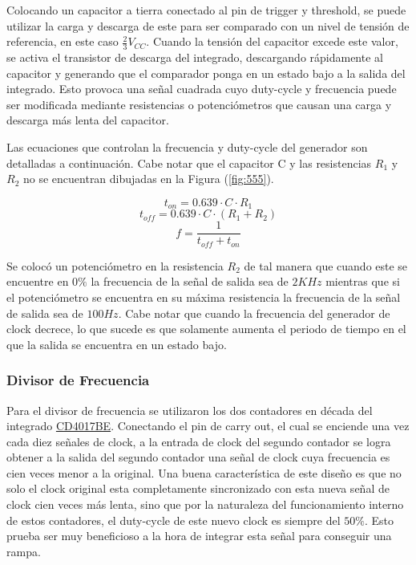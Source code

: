 Colocando un capacitor a tierra conectado al pin de trigger y threshold, se puede utilizar la carga y descarga de este para ser comparado con un nivel de tensión de referencia, en este caso $\frac{2}{3} V_{CC}$. Cuando la tensión del capacitor excede este valor, se activa el transistor de descarga del integrado, descargando rápidamente al capacitor y generando que el comparador ponga en un estado bajo a la salida del integrado. Esto provoca una señal cuadrada cuyo duty-cycle y frecuencia puede ser modificada mediante resistencias o potenciómetros que causan una carga y descarga más lenta del capacitor. 

Las ecuaciones que controlan la frecuencia y duty-cycle del generador son detalladas a continuación. Cabe notar que el capacitor C y las resistencias $R_1$ y $R_2$ no se encuentran dibujadas en la Figura (\ref{fig:555}).

\begin{equation}
t_{on} = 0.639\cdot C \cdot R_1
\end{equation}
\begin{equation}
t_{off} = 0.639 \cdot C \cdot (R_1 + R_2)
\end{equation}
\begin{equation}
f=\frac{1}{t_{off} + t_{on}}
\end{equation}

Se colocó un potenciómetro en la resistencia $R_2$ de tal manera que cuando este se encuentre en $0\%$ la frecuencia de la señal de salida sea de $2KHz$ mientras que si el potenciómetro se encuentra en su máxima resistencia la frecuencia de la señal de salida sea de $100Hz$. Cabe notar que cuando la frecuencia del generador de clock decrece, lo que sucede es que solamente aumenta el periodo de tiempo en el que la salida se encuentra en un estado bajo.

\subsubsection{Divisor de Frecuencia}

Para el divisor de frecuencia se utilizaron los dos contadores en década del integrado \href{http://www.ti.com/lit/ds/symlink/cd4017b.pdf}{CD4017BE}. Conectando el pin de carry out, el cual se enciende una vez cada diez señales de clock, a la entrada de clock del segundo contador se logra obtener a la salida del segundo contador una señal de clock cuya frecuencia es cien veces menor a la original. Una buena característica de este diseño es que no solo el clock original esta completamente sincronizado con esta nueva señal de clock cien veces más lenta, sino que por la naturaleza del funcionamiento interno de estos contadores, el duty-cycle de este nuevo clock es siempre del $50\%$. Esto prueba ser muy beneficioso a la hora de integrar esta señal para conseguir una rampa.

